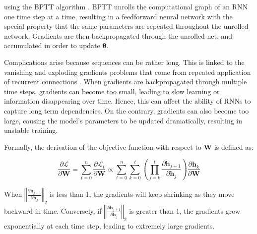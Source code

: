 using the \ac{BPTT} algorithm \citep{werbos1990backpropagation}. \ac{BPTT} unrolls the computational graph of an \ac{RNN} one time step at a time, resulting in a feedforward neural network with the special property that the same parameters are repeated throughout the unrolled network. Gradients are then backpropagated through the unrolled net, and accumulated in order to update $\bm{\theta}$. 


Complications arise because sequences can be rather long. This is linked to the vanishing and exploding gradients problems that come from repeated application of recurrent connections \citep{hochreiter2001gradient}. When gradients are backpropagated through multiple time steps, gradients can become too small, leading to slow learning or information disappearing over time. Hence, this can affect the ability of \acp{RNN} to capture long term dependencies. On the contrary, gradients can also become too large, causing the model's parameters to be updated dramatically, resulting in unstable training. 

Formally, the derivation of the objective function with respect to $\bm{W}$ is defined as:

\begin{equation}
    \frac{\partial \mathcal{L}}{\partial \bm{W}} = \sum_{t=0}^{n} \frac{\partial \mathcal{L}_t}{\partial \bm{W}} \propto \sum_{t=0}^{n} \sum_{k=0}^{t} \left( \prod_{j = k} ^{t} \frac{\partial \bm{h}_{j+1}}{\partial \bm{h}_{j}} \right) \frac{\partial \bm{h}_{k}}{\partial \bm{W}}
\end{equation}


When $\left\Vert \frac{\partial \bm{h}_{j+1}}{\partial \bm{h}_{j}} \right\Vert_2$ is less than 1, the gradients will keep shrinking as they move backward in time. Conversely, if $\left\Vert \frac{\partial \bm{h}_{j+1}}{\partial \bm{h}_{j}} \right\Vert_2$ is greater than 1, the gradients grow exponentially at each time step, leading to extremely large gradients. 


